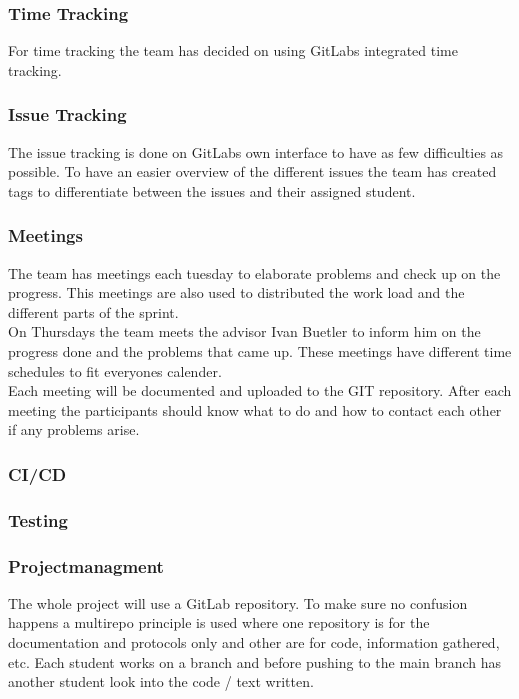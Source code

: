 \subsubsection*{Time Tracking}
For time tracking the team has decided on using GitLabs integrated time tracking. 
\subsubsection*{Issue Tracking}
The issue tracking is done on GitLabs own interface to have as few difficulties as possible. To have an easier overview of the different issues the team has created tags to differentiate between the issues and their assigned student. 

\subsubsection*{Meetings}
The team has meetings each tuesday to elaborate problems and check up on the progress. This meetings are also used to distributed the work load and the different parts of the sprint. \\
On Thursdays the team meets the advisor Ivan Buetler to inform him on the progress done and the problems that came up. These meetings have different time schedules to fit everyones calender. \\
Each meeting will be documented and uploaded to the GIT repository. After each meeting the participants should know what to do and how to contact each other if any problems arise.
\subsubsection*{CI/CD}

\subsubsection*{Testing}

\subsubsection*{Projectmanagment}
The whole project will use a GitLab repository. To make sure no confusion happens a multirepo principle is used where one repository is for the documentation and protocols only and other are for code, information gathered, etc. Each student works on a branch and before pushing to the main branch has another student look into the code / text written. 
